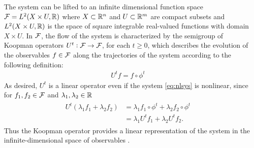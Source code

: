 The system can be lifted to an infinite dimensional function space $\mathcal{F} = L^2(X \times U, \mathbb{R})$ where $X \subset \mathbb{R}^n$ and $U \subset \mathbb{R}^m$ are compact subsets and $ L^2(X \times U, \mathbb{R})$ is the space of square integrable real-valued functions with domain $X \times U$.
In $\mathcal{F}$, the flow of the system is characterized by the semigroup  of Koopman operators 
$U^t : \mathcal{F} \to \mathcal{F}$, for each $t \geq 0$,
which describes the evolution of the observables $f \in \mathcal{F}$ along the trajectories of the system according to the following definition:
\begin{align}
    U^t f = f \circ \phi^t      
    \label{eq:koopman}
\end{align}
As desired, $U^t$ is a linear operator even if the system \eqref{eq:nlsys} is nonlinear, since for $f_1, f_2 \in \mathcal{F}$ and $\lambda_1, \lambda_2 \in \mathbb{R}$
\begin{align}
    \begin{split}
    U^t (\lambda_1 f_1 + \lambda_2 f_2) &= \lambda_1 f_1 \circ \phi^t + \lambda_2 f_2 \circ \phi^t \\
    &= \lambda_1 U^t f_1 + \lambda_2 U^t f_2.
    \end{split}
\end{align}
Thus the Koopman operator provides a linear representation of the system in the infinite-dimensional space of observables \cite{budivsic2012applied}. 

